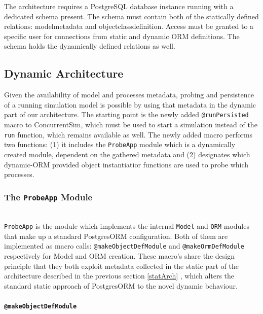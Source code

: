 \documentclass{juliacon}
\begin{document}
The architecture requires a PostgreSQL database instance running with a dedicated schema present. The schema must contain both of the statically defined relations: modelmetadata and objectclassdefinition. Access must be granted to a specific user for connections from static and dynamic ORM definitions. The schema holds the dynamically defined relations as well. \vskip 6pt

\subsection{Dynamic Architecture}

Given the availability of model and processes metadata, probing and persistence of a running simulation model is possible by using that metadata in the dynamic part of our architecture. The starting point is the newly added \texttt{@runPersisted} macro to ConcurrentSim, which must be used to start a simulation  instead of the \texttt{run} function, which remains available as well. The newly added macro performs two functions: (1) it includes the \texttt{ProbeApp} module which is a dynamically created module, dependent on the gathered metadata and (2) designates which dynamic-ORM provided object instantiatior functions are used to probe which processes. \vskip 6pt

\subsubsection{The \textnormal{\texttt{ProbeApp}} Module}\hfill\\

\texttt{ProbeApp} is the module which implements the internal \texttt{Model} and \texttt{ORM} modules that make up a standard PostgresORM configuration. Both of them are implemented as macro calls: \texttt{@makeObjectDefModule} and \texttt{@makeOrmDefModule} respectively for Model and ORM creation. These macro's share the design principle that they both exploit metadata collected in the static part of the architecture described in the previous section \ref{statArch} , which alters the standard static approach of PostgresORM to the novel dynamic behaviour.\vskip 6pt

\paragraph{\textnormal{\texttt{@makeObjectDefModule}}}\hfill\\
\end{document}
